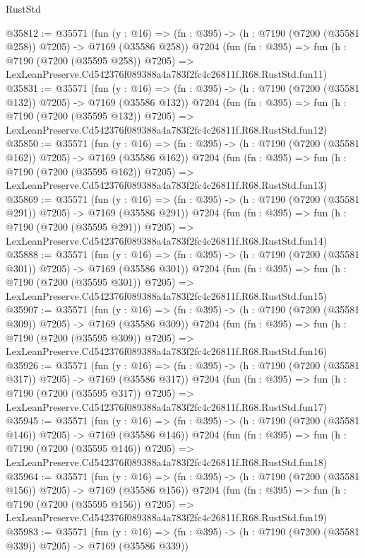 \begin{lexlean}{RustStd}
\begin{coremodule}
@35812 := @35571
    (fun (y : @16) => (fn : @395) -> (h : @7190 (@7200 (@35581 @258)) @7205) -> @7169 (@35586 @258))
    @7204
    (fun (fn : @395) =>
    fun (h : @7190 (@7200 (@35595 @258)) @7205) =>
    LexLeanPreserve.Cd542376f089388a4a783f2fc4c26811f.R68.RustStd.fun11)
@35831 := @35571
    (fun (y : @16) => (fn : @395) -> (h : @7190 (@7200 (@35581 @132)) @7205) -> @7169 (@35586 @132))
    @7204
    (fun (fn : @395) =>
    fun (h : @7190 (@7200 (@35595 @132)) @7205) =>
    LexLeanPreserve.Cd542376f089388a4a783f2fc4c26811f.R68.RustStd.fun12)
@35850 := @35571
    (fun (y : @16) => (fn : @395) -> (h : @7190 (@7200 (@35581 @162)) @7205) -> @7169 (@35586 @162))
    @7204
    (fun (fn : @395) =>
    fun (h : @7190 (@7200 (@35595 @162)) @7205) =>
    LexLeanPreserve.Cd542376f089388a4a783f2fc4c26811f.R68.RustStd.fun13)
@35869 := @35571
    (fun (y : @16) => (fn : @395) -> (h : @7190 (@7200 (@35581 @291)) @7205) -> @7169 (@35586 @291))
    @7204
    (fun (fn : @395) =>
    fun (h : @7190 (@7200 (@35595 @291)) @7205) =>
    LexLeanPreserve.Cd542376f089388a4a783f2fc4c26811f.R68.RustStd.fun14)
@35888 := @35571
    (fun (y : @16) => (fn : @395) -> (h : @7190 (@7200 (@35581 @301)) @7205) -> @7169 (@35586 @301))
    @7204
    (fun (fn : @395) =>
    fun (h : @7190 (@7200 (@35595 @301)) @7205) =>
    LexLeanPreserve.Cd542376f089388a4a783f2fc4c26811f.R68.RustStd.fun15)
@35907 := @35571
    (fun (y : @16) => (fn : @395) -> (h : @7190 (@7200 (@35581 @309)) @7205) -> @7169 (@35586 @309))
    @7204
    (fun (fn : @395) =>
    fun (h : @7190 (@7200 (@35595 @309)) @7205) =>
    LexLeanPreserve.Cd542376f089388a4a783f2fc4c26811f.R68.RustStd.fun16)
@35926 := @35571
    (fun (y : @16) => (fn : @395) -> (h : @7190 (@7200 (@35581 @317)) @7205) -> @7169 (@35586 @317))
    @7204
    (fun (fn : @395) =>
    fun (h : @7190 (@7200 (@35595 @317)) @7205) =>
    LexLeanPreserve.Cd542376f089388a4a783f2fc4c26811f.R68.RustStd.fun17)
@35945 := @35571
    (fun (y : @16) => (fn : @395) -> (h : @7190 (@7200 (@35581 @146)) @7205) -> @7169 (@35586 @146))
    @7204
    (fun (fn : @395) =>
    fun (h : @7190 (@7200 (@35595 @146)) @7205) =>
    LexLeanPreserve.Cd542376f089388a4a783f2fc4c26811f.R68.RustStd.fun18)
@35964 := @35571
    (fun (y : @16) => (fn : @395) -> (h : @7190 (@7200 (@35581 @156)) @7205) -> @7169 (@35586 @156))
    @7204
    (fun (fn : @395) =>
    fun (h : @7190 (@7200 (@35595 @156)) @7205) =>
    LexLeanPreserve.Cd542376f089388a4a783f2fc4c26811f.R68.RustStd.fun19)
@35983 := @35571
    (fun (y : @16) => (fn : @395) -> (h : @7190 (@7200 (@35581 @339)) @7205) -> @7169 (@35586 @339))

\end{coremodule}
\end{lexlean}
